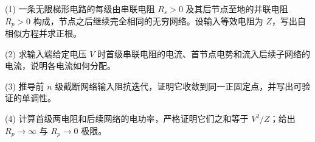(1) 一条无限梯形电路的每级由串联电阻 \(R_s>0\) 及其后节点至地的并联电阻 \(R_p>0\) 构成，节点之后继续完全相同的无穷网络。设输入等效电阻为 \(Z\)，写出自相似方程并求正根。

(2) 求输入端给定电压 \(V\) 时首级串联电阻的电流、首节点电势和流入后续子网络的电流，说明各电流如何分配。

(3) 推导前 \(n\) 级截断网络输入阻抗迭代，证明它收敛到同一正固定点，并写出可验证的单调性。

(4) 计算首级两电阻和后续网络的电功率，严格证明它们之和等于 \(V^2/Z\)；给出 \(R_p\to\infty\) 与 \(R_p\to0\) 极限。
